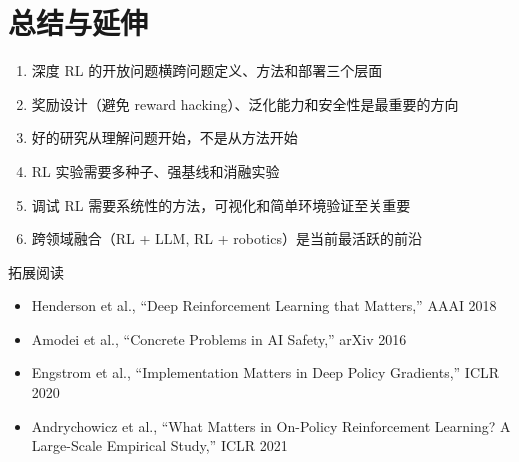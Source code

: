 \section{总结与延伸}

\begin{enumerate}
    \item 深度 RL 的开放问题横跨问题定义、方法和部署三个层面
    \item 奖励设计（避免 reward hacking）、泛化能力和安全性是最重要的方向
    \item 好的研究从理解问题开始，不是从方法开始
    \item RL 实验需要多种子、强基线和消融实验
    \item 调试 RL 需要系统性的方法，可视化和简单环境验证至关重要
    \item 跨领域融合（RL + LLM, RL + robotics）是当前最活跃的前沿
\end{enumerate}

\begin{knowledgebox}{拓展阅读}
\begin{itemize}
    \item Henderson et al., ``Deep Reinforcement Learning that Matters,'' AAAI 2018
    \item Amodei et al., ``Concrete Problems in AI Safety,'' arXiv 2016
    \item Engstrom et al., ``Implementation Matters in Deep Policy Gradients,'' ICLR 2020
    \item Andrychowicz et al., ``What Matters in On-Policy Reinforcement Learning? A Large-Scale Empirical Study,'' ICLR 2021
\end{itemize}
\end{knowledgebox}



